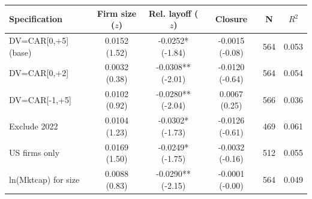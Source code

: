 \begin{tabular}{lccccc}
\toprule
Specification & Firm size ($z$) & Rel. layoff ($z$) & Closure & N & $R^2$ \\
\midrule
DV=CAR[0,+5] (base) & 0.0152 (1.52) & -0.0252* (-1.84) & -0.0015 (-0.08) & 564 & 0.053 \\
DV=CAR[0,+2] & 0.0032 (0.38) & -0.0308** (-2.01) & -0.0120 (-0.64) & 564 & 0.054 \\
DV=CAR[-1,+5] & 0.0102 (0.92) & -0.0280** (-2.04) & 0.0067 (0.25) & 566 & 0.036 \\
Exclude 2022 & 0.0104 (1.23) & -0.0302* (-1.73) & -0.0126 (-0.61) & 469 & 0.061 \\
US firms only & 0.0169 (1.50) & -0.0249* (-1.75) & -0.0032 (-0.16) & 512 & 0.055 \\
ln(Mktcap) for size & 0.0088 (0.83) & -0.0290** (-2.15) & -0.0001 (-0.00) & 564 & 0.049 \\
\bottomrule
\end{tabular}